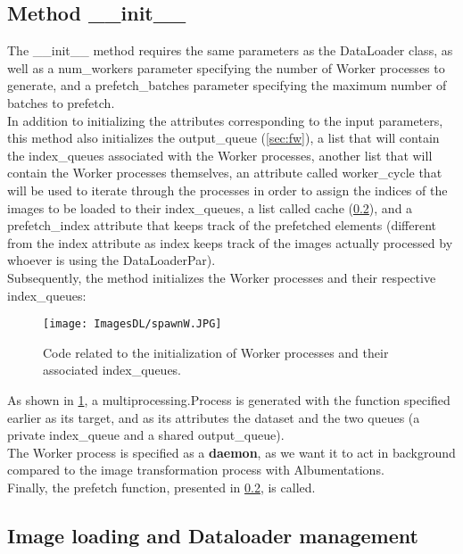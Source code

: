 \documentclass[10pt,twocolumn,letterpaper]{article}
\begin{document}
\subsection{Method \_\_init\_\_}


The \_\_init\_\_ method requires the same parameters as the DataLoader class, as well as a num\_workers parameter specifying the number of Worker processes to generate, and a prefetch\_batches parameter specifying the maximum number of batches to prefetch.\\
In addition to initializing the attributes corresponding to the input parameters, this method also initializes the output\_queue (\cref{sec:fw}), a list that will contain the index\_queues associated with the Worker processes, another list that will contain the Worker processes themselves, an attribute called worker\_cycle that will be used to iterate through the processes in order to assign the indices of the images to be loaded to their index\_queues, a list called cache (\cref{sec:load}), and a prefetch\_index attribute that keeps track of the prefetched elements (different from the index attribute as index keeps track of the images actually processed by whoever is using the DataLoaderPar).\\
Subsequently, the method initializes the Worker processes and their respective index\_queues:

\begin{figure}[h]
    \centering
    \texttt{[image: ImagesDL/spawnW.JPG]}
    \caption{Code related to the initialization of Worker processes and their associated index\_queues.}
    \label{fig:spW}
\end{figure}


As shown in \cref{fig:spW}, a multiprocessing.Process is generated with the function specified earlier as its target, and as its attributes the dataset and the two queues (a private index\_queue and a shared output\_queue).\\
The Worker process is specified as a \textbf{daemon}, as we want it to act in background compared to the image transformation process with Albumentations.\\
Finally, the prefetch function, presented in \cref{sec:load}, is called.

\subsection{Image loading and Dataloader management}
\label{sec:load}
\end{document}
